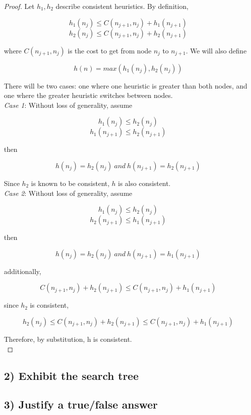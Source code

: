 \documentclass{article}
\begin{document}
\begin{proof}

	Let $h_{1}, h_{2}$ describe consistent heuristics. By definition,

	\[h_{1}(n_{j}) \leq C(n_{j+1}, n_{j}) + h_{1}(n_{j + 1})\]
	\[h_{2}(n_{j}) \leq C(n_{j+1}, n_{j}) + h_{2}(n_{j + 1})\]

	where $C(n_{j+1}, n_{j})$ is the cost to get from node $n_{j}$ to $n_{j + 1} $. We will also define

	\[h(n) = max(h_{1}(n_{j}), h_{2}(n_{j}))\]

	There will be two cases: one where one heuristic is greater than both nodes, and one where the greater heuristic switches between nodes.\\

	\emph{Case 1}: Without loss of generality, assume
	
	\[h_{1}(n_{j}) \leq h_{2}(n_{j})\]
	\[h_{1}(n_{j + 1}) \leq h_{2}(n_{j + 1})\]
	
	then
	
	\[h(n_{j}) = h_{2}(n_{j})\ and\ h(n_{j + 1}) = h_{2}(n_{j + 1})\]
	
	Since $h_{2}$ is known to be consistent, $h$ is also consistent.\\

	\emph{Case 2}: Without loss of generality, assume
		
		\[h_{1}(n_{j}) \leq h_{2}(n_{j})\]
		\[h_{2}(n_{j + 1}) \leq h_{1}(n_{j + 1})\]
		
		then
			
		\[h(n_{j}) = h_{2}(n_{j})\ and\ h(n_{j + 1}) = h_{1}(n_{j + 1})\]
		
		additionally,
		
		\[C(n_{j+1}, n_{j}) + h_{2}(n_{j + 1}) \leq C(n_{j+1}, n_{j}) + h_{1}(n_{j + 1})\]
		
		since $h_{2}$ is consistent,
		
		\[h_{2}(n_{j}) \leq C(n_{j+1}, n_{j}) + h_{2}(n_{j + 1}) \leq C(n_{j+1}, n_{j}) + h_{1}(n_{j + 1})\]
		
		Therefore, by substitution, h is consistent.\\

\end{proof}


\subsection*{2) Exhibit the search tree}

\subsection*{3) Justify a true/false answer}
\end{document}
